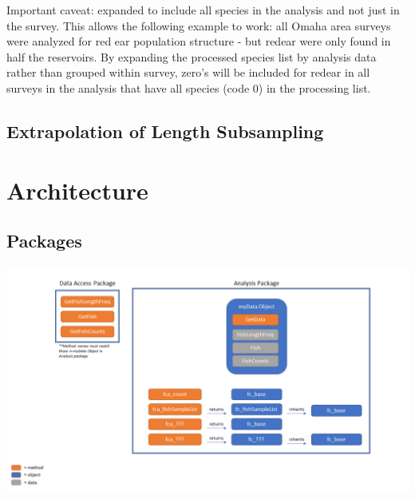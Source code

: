\documentclass[
  letterpaper,
  DIV=11,
  numbers=noendperiod]{scrreprt}
\begin{document}
\begin{tcolorbox}[enhanced jigsaw, leftrule=.75mm, coltitle=black, colbacktitle=quarto-callout-note-color!10!white, colframe=quarto-callout-note-color-frame, opacitybacktitle=0.6, rightrule=.15mm, colback=white, bottomtitle=1mm, toptitle=1mm, titlerule=0mm, breakable, bottomrule=.15mm, toprule=.15mm, title=\textcolor{quarto-callout-note-color}{\faInfo}\hspace{0.5em}{Note}, arc=.35mm, opacityback=0, left=2mm]

Important caveat: expanded to include all species in the analysis and
not just in the survey. This allows the following example to work: all
Omaha area surveys were analyzed for red ear population structure - but
redear were only found in half the reservoirs. By expanding the
processed species list by analysis data rather than grouped within
survey, zero's will be included for redear in all surveys in the
analysis that have all species (code 0) in the processing list.

\end{tcolorbox}

\section{Extrapolation of Length
Subsampling}\label{extrapolation-of-length-subsampling}

\chapter{Architecture}\label{architecture}

\section{Packages}\label{packages}

\includegraphics{ArchVis/Slide1.PNG}
\end{document}
